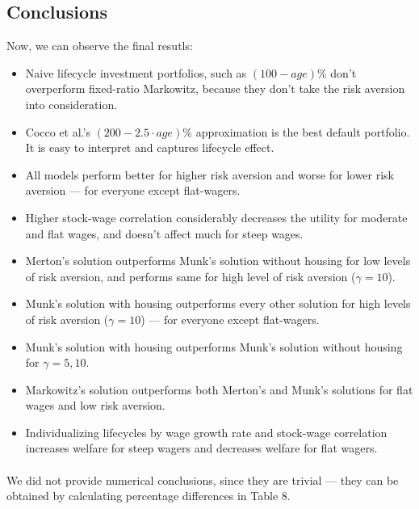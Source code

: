 \documentclass[]{article}
\begin{document}
\resetgeometry

\subsection{Conclusions}
Now, we can observe the final resutls:

\begin{itemize}

\item Naive lifecycle investment portfolios, such as $(100-age)\%$ don't overperform fixed-ratio Markowitz, because they don't take the risk aversion into consideration.
\item Cocco et al.'s $(200-2.5\cdot age)\%$ approximation is the best default portfolio. It is easy to interpret and captures lifecycle effect.
\item All models perform better for higher risk aversion and worse for lower risk aversion --- for everyone except flat-wagers.
\item Higher stock-wage correlation considerably decreases the utility for moderate and flat wages, and doesn't affect much for steep wages.
\item Merton's solution outperforms Munk's solution without housing for low levels of risk aversion, and performs same for high level of risk aversion ($\gamma=10$).
\item Munk's solution with housing outperforms every other solution for high levels of risk aversion ($\gamma=10$) --- for everyone except flat-wagers.
\item Munk's solution with housing outperforms Munk's solution without housing for $\gamma=5,10$.
\item Markowitz's solution outperforms both Merton's and Munk's solutions for flat wages and low risk aversion.
\item Individualizing lifecycles by wage growth rate and stock-wage correlation increases welfare for steep wagers and decreases welfare for flat wagers.
\end{itemize}

\paragraph{}We did not provide numerical conclusions, since they are trivial --- they can be obtained by calculating percentage differences in Table 8.
\end{document}
